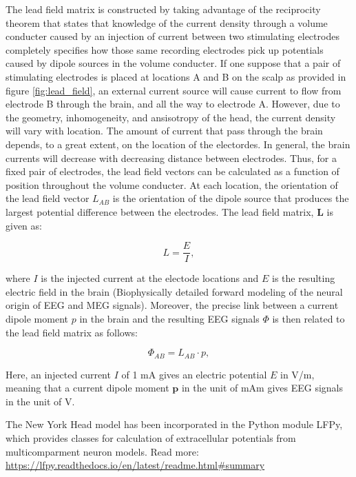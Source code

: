 \documentclass[a4paper, UKenglish, 11pt]{uiomaster}
\begin{document}
The lead field matrix is constructed by taking advantage of the reciprocity theorem that states that knowledge of the current density through a volume conducter caused by an injection of current between two stimulating electrodes completely specifies how those same recording electrodes pick up potentials caused by dipole sources in the volume conducter. If one suppose that a pair of stimulating electrodes is placed at locations A and B on the scalp as provided in figure \ref{fig:lead_field}, an external current source will cause current to flow from electrode B through the brain, and all the way to electrode A. However, due to the geometry, inhomogeneity, and ansisotropy of the head, the current density will vary with location. The amount of current that pass through the brain depends, to a great extent, on the location of the electordes. In general, the brain currents will decrease with decreasing distance between electrodes. Thus, for a fixed pair of electrodes, the lead field vectors can be calculated as a function of position throughout the volume conducter. At each location, the orientation of the lead field vector $L_{AB}$ is the orientation of the dipole source that produces the largest potential difference between the electrodes. The lead field matrix, $\boldsymbol{L}$ is given as:

\begin{equation}
L = \frac{E}{I},
\label{eq:R2}
\end{equation}

where $I$ is the injected current at the electode locations and $E$ is the resulting electric field in the brain (Biophysically detailed forward modeling of the neural origin of EEG and MEG signals). Moreover, the precise link between a current dipole moment $p$ in the brain and the resulting EEG signals $\Phi$ is then related to the lead field matrix as follows:

\begin{equation}
\Phi_{AB} = L_{AB} \cdot p,
\label{eq:EEG_signal}
\end{equation}

Here, an injected current $I$ of 1 mA gives an electric potential $E$ in V/m, meaning that a current dipole moment $\textbf{p}$ in the unit of mAm gives EEG signals in the unit of V.


The New York Head model has been incorporated in the Python module LFPy, which provides classes for calculation of extracellular potentials from multicomparment neuron models. Read more: \url{https://lfpy.readthedocs.io/en/latest/readme.html#summary}
\end{document}
